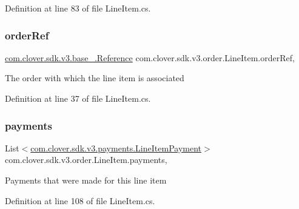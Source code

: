 Definition at line 83 of file Line\+Item.\+cs.

\mbox{\label{classcom_1_1clover_1_1sdk_1_1v3_1_1order_1_1_line_item_ac67beb7ddb5e2fbc1e74724e616be1e1}} 
\subsubsection{\texorpdfstring{order\+Ref}{orderRef}}
{\footnotesize\ttfamily \hyperlink{classcom_1_1clover_1_1sdk_1_1v3_1_1base___1_1_reference}{com.\+clover.\+sdk.\+v3.\+base\+\_\+.\+Reference} com.\+clover.\+sdk.\+v3.\+order.\+Line\+Item.\+order\+Ref\hspace{0.3cm}{\ttfamily [get]}, {\ttfamily [set]}}



The order with which the line item is associated 



Definition at line 37 of file Line\+Item.\+cs.

\mbox{\label{classcom_1_1clover_1_1sdk_1_1v3_1_1order_1_1_line_item_a4f6f64ae18b773281567764a88ba5ffa}} 
\subsubsection{\texorpdfstring{payments}{payments}}
{\footnotesize\ttfamily List$<$\hyperlink{classcom_1_1clover_1_1sdk_1_1v3_1_1payments_1_1_line_item_payment}{com.\+clover.\+sdk.\+v3.\+payments.\+Line\+Item\+Payment}$>$ com.\+clover.\+sdk.\+v3.\+order.\+Line\+Item.\+payments\hspace{0.3cm}{\ttfamily [get]}, {\ttfamily [set]}}



Payments that were made for this line item 



Definition at line 108 of file Line\+Item.\+cs.

